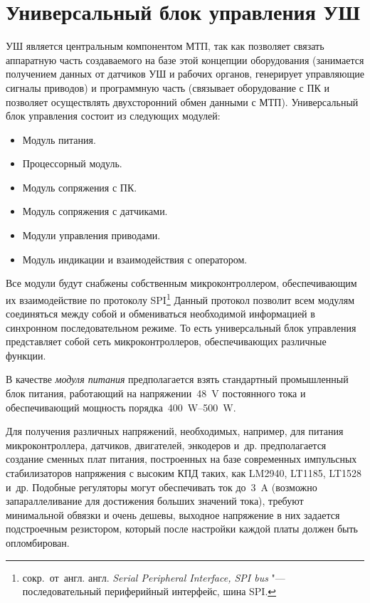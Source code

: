 \section{Универсальный блок управления УШ}


УШ является центральным компонентом МТП, так как позволяет связать аппаратную часть создаваемого на базе этой концепции оборудования (занимается получением данных от датчиков УШ и рабочих органов, генерирует управляющие сигналы приводов) и программную часть (связывает оборудование с ПК и позволяет осуществлять двухсторонний обмен данными с МТП). Универсальный блок управления состоит из следующих модулей:

\begin{itemize}
	\item Модуль питания.
	\item Процессорный модуль.
	\item Модуль сопряжения с ПК.
	\item Модуль сопряжения с датчиками.
	\item Модули управления приводами.
	\item Модуль индикации и взаимодействия с оператором.
\end{itemize}

Все модули будут снабжены собственным микроконтроллером, обеспечивающим их взаимодействие по протоколу \foreignlanguage{english}{SPI}\footnote{сокр.~от~англ. англ. \textit{Serial Peripheral Interface, SPI bus} "--- последовательный периферийный интерфейс, шина SPI.} Данный протокол позволит всем модулям соединяться между собой и обмениваться необходимой информацией в синхронном последовательном режиме. То есть универсальный блок управления представляет собой сеть микроконтроллеров, обеспечивающих различные функции.

В качестве \textit{модуля питания} предполагается взять стандартный промышленный блок питания, работающий на напряжении~\SI{48}{\volt} постоянного тока и обеспечивающий мощность порядка~\SIrange{400}{500}{\watt}.

Для получения различных напряжений, необходимых, например, для питания микроконтроллера, датчиков, двигателей, энкодеров и~др. предполагается создание сменных плат питания, построенных на базе современных импульсных стабилизаторов напряжения с высоким КПД таких, как LM2940, LT1185, LT1528 и~др. Подобные регуляторы могут обеспечивать ток до~\SI{3}{\ampere} (возможно запараллеливание для достижения больших значений тока), требуют минимальной обвязки и очень дешевы, выходное напряжение в них задается подстроечным резистором, который после настройки каждой платы должен быть опломбирован.


